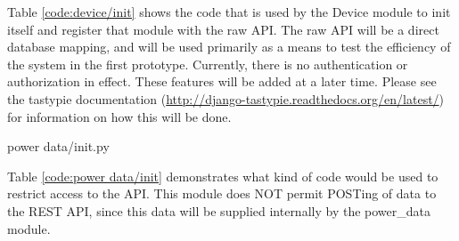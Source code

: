 Table \ref{code:device/init} shows the code that is used by the Device module to init itself and register that module with the raw API.
The raw API will be a direct database mapping, and will be used primarily as a means to test the efficiency of the system in the first prototype.
Currently, there is no authentication or authorization in effect.
These features will be added at a later time.
Please see the tastypie documentation (\url{http://django-tastypie.readthedocs.org/en/latest/}) for information on how this will be done.

\begin{table}[H]
  \centering
  \caption{power data/init.py}
  \label{code:power data/init}
  
\end{table}

Table \ref{code:power data/init} demonstrates what kind of code would be used to restrict access to the API.
This module does NOT permit POSTing of data to the REST API, since this data will be supplied internally by the power\_data module.